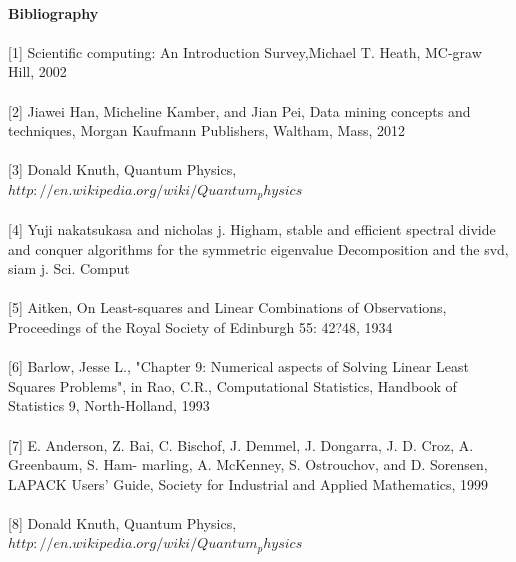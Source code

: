 \documentclass[pdftex,12pt,a4paper]{article}
\begin{document}
\paragraph{}




\Large\textbf{Bibliography}
\paragraph{}
\small{[1] Scientific computing: An Introduction Survey,Michael T. Heath, MC-graw Hill, 2002}
\paragraph{}
\small{[2] Jiawei Han, Micheline Kamber, and Jian Pei, Data mining concepts and techniques, Morgan Kaufmann Publishers, Waltham, Mass, 2012}
\paragraph{}
\small{[3] Donald Knuth, Quantum Physics, $http://en.wikipedia.org/wiki/Quantum_physics$}
\paragraph{}
\small{[4] Yuji nakatsukasa and nicholas j. Higham, stable and efficient spectral divide and conquer algorithms for the symmetric eigenvalue
Decomposition and the svd, siam j. Sci. Comput}
\paragraph{}
\small{[5]  Aitken, On Least-squares and Linear Combinations of Observations,  Proceedings of the Royal Society of Edinburgh 55: 42?48, 1934}
\paragraph{}
\small{[6] Barlow, Jesse L., "Chapter 9: Numerical aspects of Solving Linear Least Squares Problems", in Rao, C.R., Computational Statistics, Handbook of Statistics 9, North-Holland, 1993} 
\paragraph{}
\small{[7] E. Anderson, Z. Bai, C. Bischof, J. Demmel, J. Dongarra, J. D. Croz, A. Greenbaum, S. Ham- marling, A. McKenney, S. Ostrouchov, and D. Sorensen, LAPACK Users' Guide, Society for Industrial and Applied Mathematics, 1999}
\paragraph{}
\small{[8] Donald Knuth, Quantum Physics, $http://en.wikipedia.org/wiki/Quantum_physics$}
\end{document}
